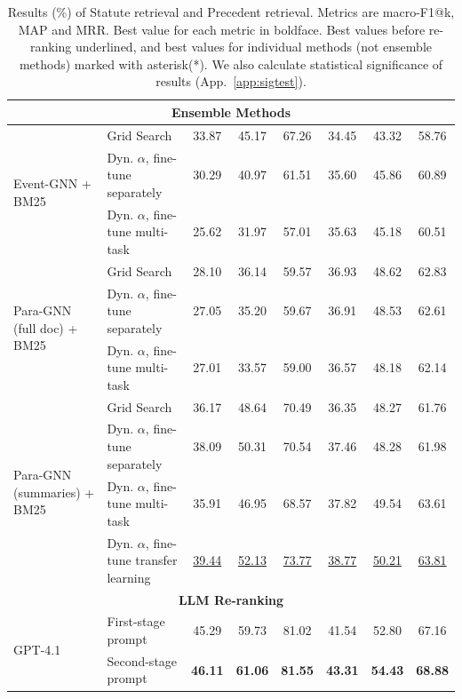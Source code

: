 \begin{table}[!thb]
\begin{tabular}{p{}p{}cccccc}
         \multicolumn{8}{c}{\textbf{Ensemble Methods}}\\ \midrule 
         \multirow{3}{0.24\textwidth}{Event-GNN + BM25} & Grid Search & 33.87 & 45.17 & 67.26 & 34.45 & 43.32 & 58.76 \\
         & Dyn. $\alpha$, fine-tune separately & 30.29 & 40.97 & 61.51 & 35.60 & 45.86 & 60.89 \\
         & Dyn. $\alpha$, fine-tune multi-task & 25.62 & 31.97 & 57.01 & 35.63 & 45.18 & 60.51 \\ \midrule 
          \multirow{3}{0.24\textwidth}{Para-GNN (full doc) + BM25} & Grid Search & 28.10 & 36.14 & 59.57 & 36.93 & 48.62 & 62.83 \\
          & Dyn. $\alpha$, fine-tune separately & 27.05 & 35.20 & 59.67 & 36.91 & 48.53 & 62.61 \\
          & Dyn. $\alpha$, fine-tune multi-task & 27.01 & 33.57 & 59.00 & 36.57 & 48.18 & 62.14 \\ \midrule 
          \multirow{4}{0.24\textwidth}{Para-GNN (summaries) + BM25} & Grid Search& 36.17 & 48.64 & 70.49 & 36.35 & 48.27 & 61.76 \\
          & Dyn. $\alpha$, fine-tune separately & 38.09&  50.31&  70.54& 37.46 &  48.28&  61.98\\
          & Dyn. $\alpha$, fine-tune multi-task & 35.91 &  46.95&  68.57& 37.82 &  49.54&  63.61\\
          & Dyn. $\alpha$, fine-tune transfer learning & \underline{39.44}&  \underline{52.13}&  \underline{73.77}& \underline{38.77}&  \underline{50.21}&  \underline{63.81}\\ \midrule 
          \multicolumn{8}{c}{\textbf{LLM Re-ranking}}\\ \midrule 
          \multirow{2}{0.24\textwidth}{GPT-4.1} & First-stage prompt & 45.29& 59.73& 81.02& 41.54& 52.80& 67.16\\
          & Second-stage prompt & \textbf{46.11}& \textbf{61.06}& \textbf{81.55}& \textbf{43.31}& \textbf{54.43}& \textbf{68.88}\\
          \bottomrule
    \end{tabular}
    \vspace{-2mm}
    \caption{Results (\%) of Statute retrieval and Precedent retrieval. Metrics are macro-F1@k, MAP and MRR. Best value for each metric in boldface. Best values before re-ranking underlined, and best values for individual methods (not ensemble methods) marked with asterisk(*). We also calculate statistical significance of results  (App.~\ref{app:sigtest}).}
    \label{tab:results}
    \vspace{-5mm}
\end{table}
